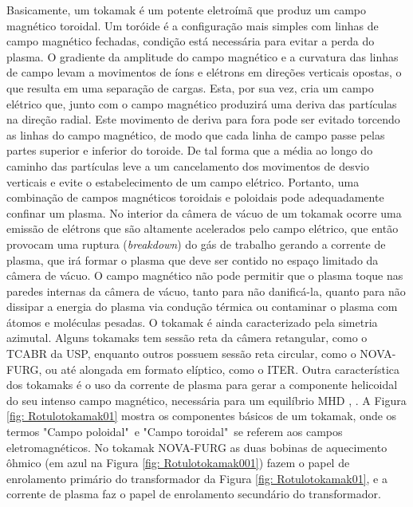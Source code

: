 \documentclass[12pt,oneside,a4paper]{abntex2}
\begin{document}
Basicamente, um tokamak é um potente eletroímã que produz um campo magnético toroidal. 
Um toróide é a configuração mais simples com linhas de campo magnético fechadas, condição está necessária para evitar a perda do plasma. %
O gradiente da amplitude do campo magnético e a curvatura das linhas de campo levam a movimentos de íons e elétrons em direções verticais opostas, o que resulta em uma separação de cargas. Esta, por sua vez, cria um campo elétrico que, junto com o campo magnético produzirá uma deriva das partículas na direção radial. %
Este movimento de deriva para fora pode ser evitado torcendo as linhas do campo magnético, de modo que cada linha de campo passe pelas partes superior e inferior do toroide. 
De tal forma que a média ao longo do caminho das partículas leve a um cancelamento dos movimentos de desvio verticais e evite o estabelecimento de um campo elétrico. 
Portanto, uma combinação de campos magnéticos toroidais e poloidais pode adequadamente confinar um plasma.
No interior da câmera de vácuo de um tokamak ocorre uma emissão de elétrons que são altamente acelerados pelo campo elétrico, que então provocam uma ruptura (\textit{breakdown}) do gás de trabalho gerando a corrente de plasma, que irá formar o plasma que deve ser contido no espaço limitado da câmera de vácuo. 
O campo magnético não pode permitir que o plasma toque nas paredes internas da câmera de vácuo, tanto para não danificá-la, quanto para não dissipar a energia do plasma via condução térmica ou contaminar o plasma com átomos e moléculas pesadas. 
O tokamak é ainda caracterizado pela simetria azimutal. 
Alguns tokamaks tem sessão reta da câmera retangular, como o TCABR da USP, enquanto outros possuem sessão reta circular, como o NOVA-FURG, ou até alongada em formato elíptico, como o ITER. 
Outra característica dos tokamaks é o uso da corrente de plasma para gerar a componente helicoidal do seu intenso campo magnético, necessária para um equilíbrio MHD \cite[pg. 34]{tokamaks}, \cite[pg. 10]{MagneticControl}. 
A Figura \ref{fig: Rotulotokamak01} mostra os componentes básicos de um tokamak, onde os termos "Campo poloidal"\ e "Campo toroidal"\ se referem aos campos eletromagnéticos. 
No tokamak NOVA-FURG as duas bobinas de aquecimento ôhmico (em azul na Figura \ref{fig: Rotulotokamak001}) fazem o papel de enrolamento primário do transformador da Figura \ref{fig: Rotulotokamak01}, e a corrente de plasma faz o papel de enrolamento secundário do transformador.
\end{document}
